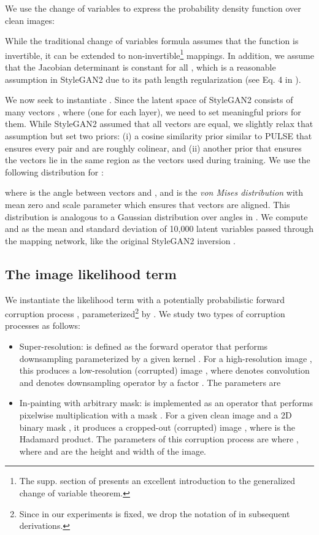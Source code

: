 \documentclass{article}
\begin{document}
We use the change of variables to express the probability density function over clean images:

While the traditional change of variables formula assumes that the function  is invertible, it can be extended to non-invertible\footnote{The supp. section of \cite{cvitkovic2019minimal} presents an excellent introduction to the generalized change of variable theorem.} mappings\cite{cvitkovic2019minimal,krantz2008geometric}. In addition, we assume that the Jacobian determinant  is constant for all , which is a reasonable assumption in StyleGAN2 due to its path length regularization (see Eq. 4 in \cite{karras2020analyzing}).

We now seek to instantiate . Since the latent space of StyleGAN2 consists of many vectors , where  (one for each layer), we need to set meaningful priors for them. While StyleGAN2 assumed that all vectors  are equal, we slightly relax that assumption but set two priors: (i) a cosine similarity prior similar to PULSE \cite{menon2020pulse} that ensures every pair  and  are roughly colinear, and (ii) another prior  that ensures the  vectors lie in the same region as the vectors used during training. We use the following distribution for :

where  is the angle between vectors  and , and  is the \emph{von Mises distribution} with mean zero and scale parameter  which ensures that vectors  are aligned. This distribution is analogous to a Gaussian distribution over angles in . We compute  and  as the mean and standard deviation of 10,000 latent variables passed through the mapping network, like the original StyleGAN2 inversion \cite{karras2020analyzing}.

\subsection{The image likelihood term}
\label{likelihood}

We instantiate the likelihood term  with a potentially probabilistic forward corruption process , parameterized\footnote{Since in our experiments  is fixed, we drop the notation of  in subsequent derivations.} by . We study two types of corruption processes  as follows:
\begin{itemize}
\item Super-resolution:  is defined as the forward operator that performs downsampling parameterized by a given kernel . For a high-resolution image , this produces a low-resolution (corrupted) image , where  denotes convolution and  denotes downsampling operator by a factor . The parameters are 
\item In-painting with arbitrary mask:  is implemented as an operator that performs pixelwise multiplication with a mask . For a given clean image  and a 2D binary mask , it produces a cropped-out (corrupted) image , where  is the Hadamard product. The parameters of this corruption process are  where , where  and  are the height and width of the image.
\end{itemize}
\end{document}

